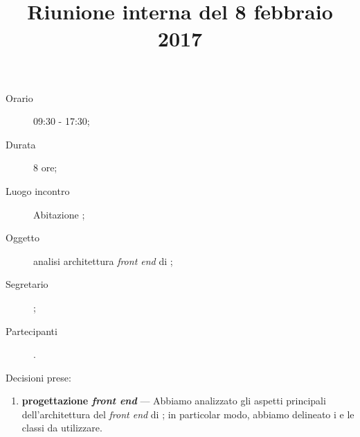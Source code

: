 


\author{\LS}
\supervisor{\LB}
\dest{\ALL}
\title{Riunione interna del 8 febbraio 2017}



\maketitle

\begin{description}
	\item[Orario] 09:30 - 17:30;
	\item[Durata] 8 ore;
	\item[Luogo incontro] Abitazione \LB;
	\item[Oggetto] analisi architettura \emph{front end} di \proj;
	\item[Segretario] \LS;
	\item[Partecipanti] \ALL.
\end{description}

Decisioni prese:
\begin{enumerate}
	\item \textbf{progettazione \emph{front end}} --- Abbiamo analizzato gli aspetti principali dell'architettura del \emph{front end} di \proj; in particolar modo, abbiamo delineato i  e le classi da utilizzare.
\end{enumerate}


